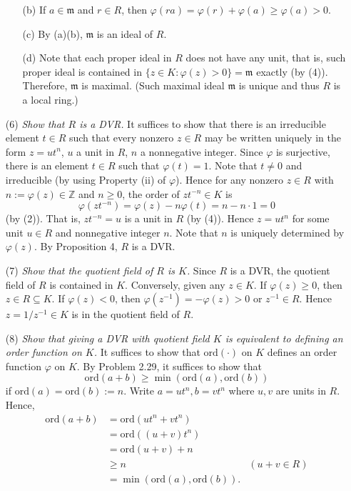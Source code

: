 \documentclass{article}
\begin{document}
\begin{enumerate}
\begin{enumerate}
  \item[(b)]
    If $a \in \mathfrak{m}$ and $r \in R$,
    then $\varphi(ra) = \varphi(r) + \varphi(a) \geq \varphi(a) > 0$.

  \item[(c)]
    By (a)(b), $\mathfrak{m}$ is an ideal of $R$.

  \item[(d)]
    Note that each proper ideal in $R$ does not have any unit, that is,
    such proper ideal is contained in $\{ z \in K : \varphi(z) > 0 \} = \mathfrak{m}$ exactly (by (4)).
    Therefore, $\mathfrak{m}$ is maximal.
    (Such maximal ideal $\mathfrak{m}$ is unique and thus $R$ is a local ring.)
  \end{enumerate}

\item[(6)]
  \emph{Show that $R$ is a DVR.}
  It suffices to show that there is an irreducible element $t \in R$
  such that every nonzero $z \in R$ may be written uniquely in the form $z = ut^n$,
  $u$ a unit in $R$, $n$ a nonnegative integer.
  Since $\varphi$ is surjective, there is an element $t \in R$
  such that $\varphi(t) = 1$.
  Note that $t \neq 0$ and irreducible (by using Property (ii) of $\varphi$).
  Hence for any nonzero $z \in R$ with $n := \varphi(z) \in \mathbb{Z}$ and $n \geq 0$,
  the order of $z t^{-n} \in K$ is
  \[
    \varphi(z t^{-n}) = \varphi(z) - n \varphi(t) = n - n \cdot 1 = 0
  \]
  (by (2)).
  That is, $z t^{-n} = u$ is a unit in $R$ (by (4)).
  Hence $z = ut^n$ for some unit $u \in R$
  and nonnegative integer $n$.
  Note that $n$ is uniquely determined by $\varphi(z)$.
  By Proposition 4, $R$ is a DVR.

\item[(7)]
  \emph{Show that the quotient field of $R$ is $K$.}
  Since $R$ is a DVR, the quotient field of $R$ is contained in $K$.
  Conversely, given any $z \in K$.
  If $\varphi(z) \geq 0$, then $z \in R \subseteq K$.
  If $\varphi(z) < 0$, then $\varphi(z^{-1}) = -\varphi(z) > 0$ or $z^{-1} \in R$.
  Hence $z = 1/z^{-1} \in K$ is in the quotient field of $R$.

\item[(8)]
  \emph{Show that giving a DVR with quotient field $K$
  is equivalent to defining an order function on $K$.}
  It suffices to show that $\mathrm{ord}(\cdot)$ on $K$ defines an order function $\varphi$ on $K$.
  By Problem 2.29,
  it suffices to show that
  \[
    \mathrm{ord}(a + b) \geq \min(\mathrm{ord}(a), \mathrm{ord}(b))
  \]
  if $\mathrm{ord}(a) = \mathrm{ord}(b) := n$.
  Write $a = ut^n, b = vt^n$ where $u, v$ are units in $R$.
  Hence,
  \begin{align*}
    \mathrm{ord}(a + b)
    &= \mathrm{ord}(ut^n + vt^n) \\
    &= \mathrm{ord}((u+v)t^n) \\
    &= \mathrm{ord}(u+v) + n \\
    &\geq n
      &(u+v \in R) \\
    &= \min(\mathrm{ord}(a), \mathrm{ord}(b)).
  \end{align*}
\end{enumerate}
\end{document}
